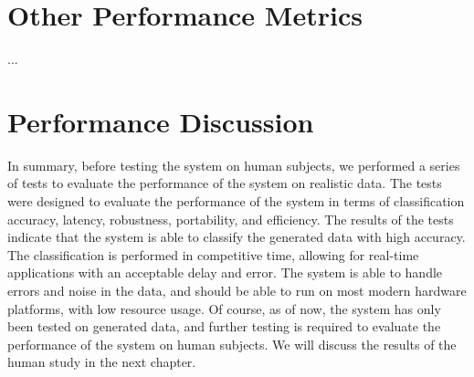 \section{Other Performance Metrics}
...

\section{Performance Discussion}
In summary, before testing the system on human subjects, we performed a series of tests to evaluate the performance of the system on realistic data.
The tests were designed to evaluate the performance of the system in terms of classification accuracy, latency, robustness, portability, and efficiency.
The results of the tests indicate that the system is able to classify the generated data with high accuracy.
The classification is performed in competitive time, allowing for real-time applications with an acceptable delay and error.
The system is able to handle errors and noise in the data, and should be able to run on most modern hardware platforms, with low resource usage.
Of course, as of now, the system has only been tested on generated data, and further testing is required to evaluate the performance of the system on human subjects.
We will discuss the results of the human study in the next chapter.
